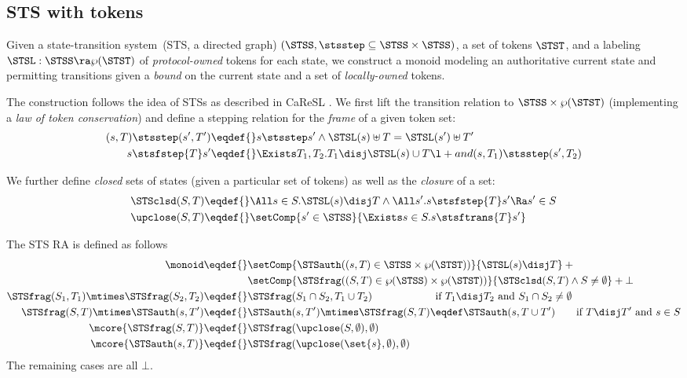 \subsection{STS with tokens}
\label{sec:stsmon}

Given a state-transition system~(STS, \ie a directed graph) $(\STSS, {\stsstep} \subseteq \STSS \times \STSS)$, a set of tokens $\STST$, and a labeling $\STSL: \STSS \ra \wp(\STST)$ of \emph{protocol-owned} tokens for each state, we construct a monoid modeling an authoritative current state and permitting transitions given a \emph{bound} on the current state and a set of \emph{locally-owned} tokens.

The construction follows the idea of STSs as described in CaReSL \cite{caresl}.
We first lift the transition relation to $\STSS \times \wp(\STST)$ (implementing a \emph{law of token conservation}) and define a stepping relation for the \emph{frame} of a given token set:
\begin{align*}
 (s, T) \stsstep (s', T') \eqdef{}& s \stsstep s' \land \STSL(s) \uplus T = \STSL(s') \uplus T' \\
 s \stsfstep{T} s' \eqdef{}& \Exists T_1, T_2. T_1 \disj \STSL(s) \cup T \l+and (s, T_1) \stsstep (s', T_2)
\end{align*}

We further define \emph{closed} sets of states (given a particular set of tokens) as well as the \emph{closure} of a set:
\begin{align*}
\STSclsd(S, T) \eqdef{}& \All s \in S. \STSL(s) \disj T \land \All s'. s \stsfstep{T} s' \Ra s' \in S \\
\upclose(S, T) \eqdef{}& \setComp{ s' \in \STSS}{\Exists s \in S. s \stsftrans{T} s' }
\end{align*}

The STS RA is defined as follows
\begin{align*}
  \monoid \eqdef{}& \setComp{\STSauth((s, T) \in \STSS \times \wp(\STST))}{\STSL(s) \disj T} +{}\\& \setComp{\STSfrag((S, T) \in \wp(\STSS) \times \wp(\STST))}{\STSclsd(S, T) \land S \neq \emptyset} + \bot \\
  \STSfrag(S_1, T_1) \mtimes \STSfrag(S_2, T_2) \eqdef{}& \STSfrag(S_1 \cap S_2, T_1 \cup T_2) \qquad\qquad\qquad \text{if $T_1 \disj T_2$ and $S_1 \cap S_2 \neq \emptyset$} \\
  \STSfrag(S, T) \mtimes \STSauth(s, T') \eqdef{}& \STSauth(s, T') \mtimes \STSfrag(S, T) \eqdef \STSauth(s, T \cup T') \qquad \text{if $T \disj T'$ and $s \in S$} \\
  \mcore{\STSfrag(S, T)} \eqdef{}& \STSfrag(\upclose(S, \emptyset), \emptyset) \\
  \mcore{\STSauth(s, T)} \eqdef{}& \STSfrag(\upclose(\set{s}, \emptyset), \emptyset)
\end{align*}
The remaining cases are all $\bot$.

